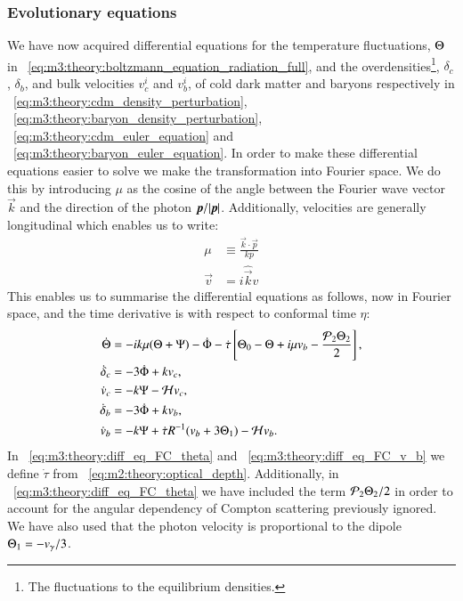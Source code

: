 \subsubsection{Evolutionary equations}
    We have now acquired differential equations for the temperature fluctuations, $\Theta$ in ~\cref{eq:m3:theory:boltzmann_equation_radiation_full}, and the overdensities\footnote{The fluctuations to the equilibrium densities.}, $\delta_c$, $\delta_b$, and bulk velocities $v_c^i$ and $v_b^i$, of cold dark matter and baryons respectively in ~\cref{eq:m3:theory:cdm_density_perturbation}, ~\cref{eq:m3:theory:baryon_density_perturbation}, ~\cref{eq:m3:theory:cdm_euler_equation} and ~\cref{eq:m3:theory:baryon_euler_equation}. In order to make these differential equations easier to solve we make the transformation into Fourier space. We do this by introducing $\mu$ as the cosine of the angle between the Fourier wave vector $\vec{k}$ and the direction of the photon $\boldsymbol{p}/\abs{\boldsymbol{p}}$. Additionally, velocities are generally longitudinal which enables us to write:
    \begin{equation}\label{eq:m3:theory:mu_and_longitudinal_vel_def}
        \begin{split}
            \mu &\equiv \frac{\vec{k}\cdot\vec{p}}{kp} \\
            \vec{v} &= i\hat{\vec{k}}v
        \end{split}
    \end{equation}
    This enables us to summarise the differential equations as follows, now in Fourier space, and the time derivative is with respect to conformal time $\eta$:
    \begin{subequations}\label{eq:m3:theory:diff_eqs_fourier_conformal}
        \begin{align}
            \dot{\Theta} &= -ik\mu(\Theta+\Psi)-\dot{\Phi}-\dot{\tau}\left[\Theta_0-\Theta+i\mu v_b-\frac{\mathcal{P}_2\Theta_2}{2}\right], \label{eq:m3:theory:diff_eq_FC_theta}\\
            \dot{\delta}_c &= -3\dot{\Phi}+kv_c, \label{eq:m3:theory:diff_eq_FC_delta_c}\\
            \dot{v}_c &= -k\Psi-\mathcal{H} v_c, \label{eq:m3:theory:diff_eq_FC_v_c}\\
            \dot{\delta}_b &= -3\dot{\Phi} + kv_b, \label{eq:m3:theory:diff_eq_FC_delta_b}\\
            \dot{v}_b &= -k\Psi + \dot{\tau}R^{-1}(v_b+3\Theta_1) - \mathcal{H} v_b. \label{eq:m3:theory:diff_eq_FC_v_b}
        \end{align}
    \end{subequations}
    In ~\cref{eq:m3:theory:diff_eq_FC_theta} and ~\cref{eq:m3:theory:diff_eq_FC_v_b} we define $\dot{\tau}$ from ~\cref{eq:m2:theory:optical_depth}. Additionally, in ~\cref{eq:m3:theory:diff_eq_FC_theta} we have included the term $\mathcal{P}_2\Theta_2/2$ in order to account for the angular dependency of Compton scattering previously ignored. We have also used that the photon velocity is proportional to the dipole $\Theta_1 = -v_\gamma/3$.

